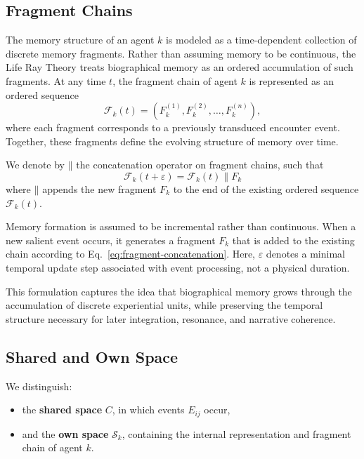 \documentclass[12pt,a4paper]{article}
\begin{document}
\subsection{Fragment Chains}

The memory structure of an agent $k$ is modeled as a time-dependent
collection of discrete memory fragments.
Rather than assuming memory to be continuous, the Life Ray Theory
treats biographical memory as an ordered accumulation of such fragments.
At any time $t$, the fragment chain of agent $k$ is represented as an ordered sequence
\[
\mathcal{F}_k(t) = (F_k^{(1)}, F_k^{(2)}, \dots, F_k^{(n)}),
\]
where each fragment corresponds to a previously transduced encounter event.
Together, these fragments define the evolving structure of memory over time.

We denote by $\mathbin{\|}$ the concatenation operator on fragment chains, such that
\begin{equation}
\mathcal{F}_k(t+\varepsilon) = \mathcal{F}_k(t) \mathbin{\|} F_k
\label{eq:fragment-concatenation}
\end{equation}
where $\mathbin{\|}$ appends the new fragment $F_k$ to the end of the existing ordered
sequence $\mathcal{F}_k(t)$.

Memory formation is assumed to be incremental rather than continuous.
When a new salient event occurs, it generates a fragment $F_k$ that is
added to the existing chain according to Eq.~\eqref{eq:fragment-concatenation}.
Here, $\varepsilon$ denotes a minimal temporal update step associated
with event processing, not a physical duration.

This formulation captures the idea that biographical memory grows
through the accumulation of discrete experiential units, while
preserving the temporal structure necessary for later integration,
resonance, and narrative coherence.

\subsection{Shared and Own Space}

We distinguish:
\begin{itemize}
    \item the \textbf{shared space} $C$, in which events $E_{ij}$ occur,
    \item and the \textbf{own space} $\mathcal{S}_k$, containing the 
          internal representation and fragment chain of agent $k$.
\end{itemize}
\end{document}
